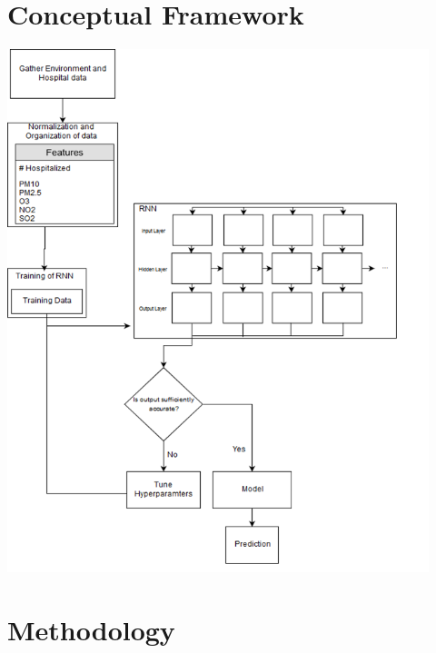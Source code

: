 ﻿\documentclass[10pt,11pt,12pt,oneside]{book}
\begin{document}
\section{Conceptual Framework}
\includegraphics[height=6in]{conframework.png}
\section{Methodology}
\end{document}

